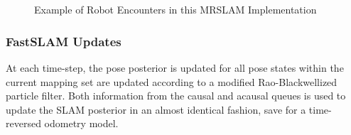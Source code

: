 \begin{figure}[ht!]
     \\
     \\
\caption{Example of Robot Encounters in this MRSLAM Implementation}
\label{fig:multiencounter}
\end{figure}

\vspace{0.1in}
\subsubsection{FastSLAM Updates}
At each time-step, the pose posterior is updated for all pose states within the current mapping set are updated according to a modified Rao-Blackwellized particle filter. Both information from the causal and acausal queues is used to update the SLAM posterior in an almost identical fashion, save for a time-reversed odometry model. 

